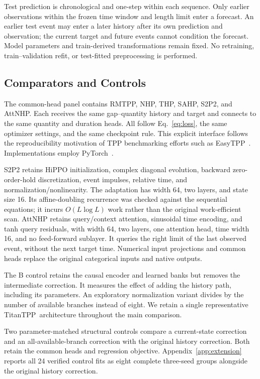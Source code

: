 \documentclass[runningheads]{llncs}
\newcommand{\method}{TitanTPP}
\begin{document}
Test prediction is chronological and one-step within each sequence.
Only earlier observations within the frozen time window and length limit
enter a forecast. An earlier test event may enter a later history after
its own prediction and observation; the current target and future events
cannot condition the forecast. Model parameters and train-derived
transformations remain fixed. No retraining, train--validation refit, or
test-fitted preprocessing is performed.

\subsection{Comparators and Controls}
The common-head panel contains RMTPP, NHP, THP, SAHP, S2P2, and AttNHP.
Each receives the same gap--quantity history and target and connects to the
same quantity and duration heads. All follow Eq.~\eqref{eq:loss}, the same
optimizer settings, and the same checkpoint rule. This explicit interface
follows the reproducibility motivation of TPP benchmarking efforts such as
EasyTPP~\cite{xue2024easytpp}. Implementations employ
PyTorch~\cite{paszke2019pytorch}.

S2P2 retains HiPPO initialization, complex diagonal evolution, backward
zero-order-hold discretization, event impulses, relative time, and
normalization/nonlinearity. The adaptation has width 64, two layers, and
state size 16. Its affine-doubling recurrence was checked against the
sequential equations; it incurs $O(L\log L)$ work rather than the original
work-efficient scan. AttNHP retains query/context attention, sinusoidal time
encoding, and tanh query residuals, with width 64, two layers, one attention
head, time width 16, and no feed-forward sublayer. It queries the right limit
of the last observed event, without the next target time. Numerical input
projections and common heads replace the original categorical inputs and
native outputs.

The B control retains the causal encoder and learned banks but removes the
intermediate correction. It measures the effect of adding the history path,
including its parameters. An exploratory normalization variant divides by
the number of available branches instead of eight. We retain a single
representative \method\ architecture throughout the main comparison.

Two parameter-matched structural controls compare a current-state correction
and an all-available-branch correction with the original history correction.
Both retain the common heads and regression objective.
Appendix~\ref{app:extension} reports all 24 verified control fits as eight
complete three-seed groups alongside the original history correction.
\end{document}

